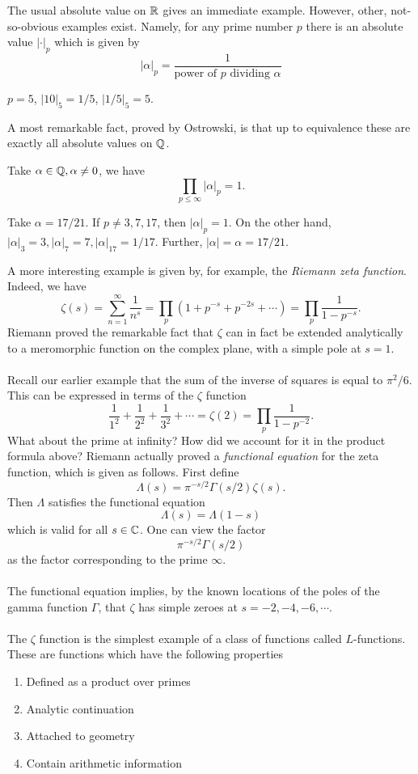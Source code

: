 \documentclass[12pt,amsfont]{amsart}
\begin{document}
The usual absolute value on ${\mathbb R}$ gives an immediate example. However, other, not-so-obvious examples exist. Namely, for any prime number $p$ there is an absolute value $|\cdot|_p$ which is given by 
\[ |\alpha|_p = \frac{1}{\text{power of } p \text{ dividing }\alpha} \]

\begin{xmp} $p = 5$, $|10|_5 = 1/5$, $|1/5|_5 = 5$. 
\end{xmp}

A most remarkable fact, proved by Ostrowski, is that up to equivalence these are exactly all absolute values on ${\mathbb Q}$. 

\begin{thm} Take $\alpha \in {\mathbb Q}, \alpha \ne 0$, we have
\[\prod_{p \leq \infty} |\alpha|_{p} = 1.\]
\end{thm}

\begin{xmp} Take $\alpha = 17/21$. If $p \ne 3, 7, 17$, then $|\alpha|_p = 1$. On the other hand, $|\alpha|_3 = 3, |\alpha|_7 = 7, |\alpha|_17 = 1/17$. Further, $|\alpha| = \alpha = 17/21$.
\end{xmp}

A more interesting example is given by, for example, the \emph{Riemann zeta function}. Indeed, we have
\[\zeta(s) = \sum_{n=1}^\infty \frac{1}{n^s} = \prod_p \left(1 + p^{-s} + p^{-2s} + \cdots \right) = \prod_p \frac{1}{1 - p^{-s}}.\]
Riemann proved the remarkable fact that $\zeta$ can in fact be extended analytically to a meromorphic function on the complex plane, with a simple pole at $s = 1$. \\ \\
Recall our earlier example that the sum of the inverse of squares is equal to $\pi^2/6$. This can be expressed in terms of the $\zeta$ function
\[\frac{1}{1^2} + \frac{1}{2^2} + \frac{1}{3^2} + \cdots = \zeta(2) = \prod_p \frac{1}{1 - p^{-2}}.\]
What about the prime at infinity? How did we account for it in the product formula above? Riemann actually proved a \emph{functional equation} for the zeta function, which is given as follows. First define
\[\Lambda(s) = \pi^{-s/2} \Gamma(s/2) \zeta(s).\]
Then $\Lambda$ satisfies the functional equation
\[\Lambda(s) = \Lambda(1-s)\]
which is valid for all $s \in {\mathbb C}$. One can view the factor
\[\pi^{-s/2} \Gamma(s/2)\]
as the factor corresponding to the prime $\infty$. \\ \\
The functional equation implies, by the known locations of the poles of the gamma function $\Gamma$, that $\zeta$ has simple zeroes at $s = -2, -4, -6, \cdots$. \\ \\
The $\zeta$ function is the simplest example of a class of functions called $L$-functions. These are functions which have the following properties
{\ }
\begin{enumerate}
\item
Defined as a product over primes
\item
Analytic continuation
\item
Attached to geometry
\item
Contain arithmetic information
\end{enumerate}
\end{document}
